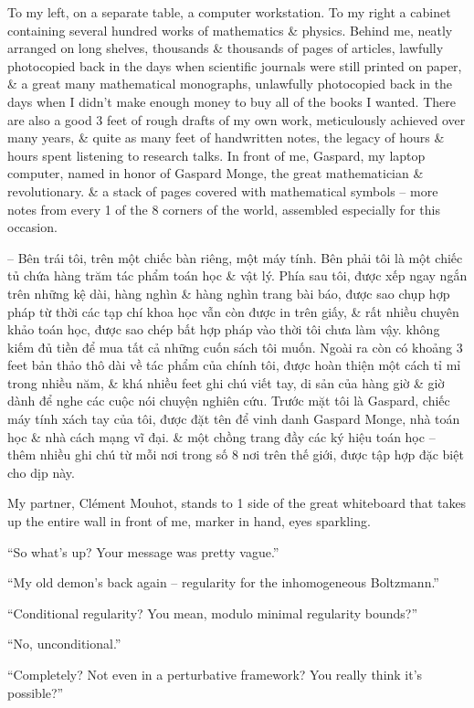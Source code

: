\documentclass{article}
\begin{document}
\begin{enumerate}
	To my left, on a separate table, a computer workstation. To my right a cabinet containing several hundred works of mathematics \& physics. Behind me, neatly arranged on long shelves, thousands \& thousands of pages of articles, lawfully photocopied back in the days when scientific journals were  still printed on paper, \& a great many mathematical monographs, unlawfully photocopied back in the days when I didn't make enough money to buy all of the books I wanted. There are also a good 3 feet of rough drafts of my own work, meticulously achieved over many years, \& quite as many feet of handwritten notes, the legacy of hours \& hours spent listening to research talks. In front of me, Gaspard, my laptop computer, named in honor of Gaspard Monge, the great mathematician \& revolutionary. \& a stack of pages covered with mathematical symbols -- more notes from every 1 of the 8 corners of the world, assembled especially for this occasion.
	
	-- Bên trái tôi, trên một chiếc bàn riêng, một máy tính. Bên phải tôi là một chiếc tủ chứa hàng trăm tác phẩm toán học \& vật lý. Phía sau tôi, được xếp ngay ngắn trên những kệ dài, hàng nghìn \& hàng nghìn trang bài báo, được sao chụp hợp pháp từ thời các tạp chí khoa học vẫn còn được in trên giấy, \& rất nhiều chuyên khảo toán học, được sao chép bất hợp pháp vào thời tôi chưa làm vậy. không kiếm đủ tiền để mua tất cả những cuốn sách tôi muốn. Ngoài ra còn có khoảng 3 feet bản thảo thô dài về tác phẩm của chính tôi, được hoàn thiện một cách tỉ mỉ trong nhiều năm, \& khá nhiều feet ghi chú viết tay, di sản của hàng giờ \& giờ dành để nghe các cuộc nói chuyện nghiên cứu. Trước mặt tôi là Gaspard, chiếc máy tính xách tay của tôi, được đặt tên để vinh danh Gaspard Monge, nhà toán học \& nhà cách mạng vĩ đại. \& một chồng trang đầy các ký hiệu toán học -- thêm nhiều ghi chú từ mỗi nơi trong số 8 nơi trên thế giới, được tập hợp đặc biệt cho dịp này.
	
	My partner, Cl\'ement Mouhot, stands to 1 side of the great whiteboard that takes up the entire wall in front of me, marker in hand, eyes sparkling.
	
	``So what's up? Your message was pretty vague.''
	
	``My old demon's back again -- regularity for the inhomogeneous Boltzmann.''
	
	``Conditional regularity? You mean, modulo minimal regularity bounds?''
	
	``No, unconditional.''
	
	``Completely? Not even in a perturbative framework? You really think it's possible?''
	

\end{enumerate}
\end{document}
